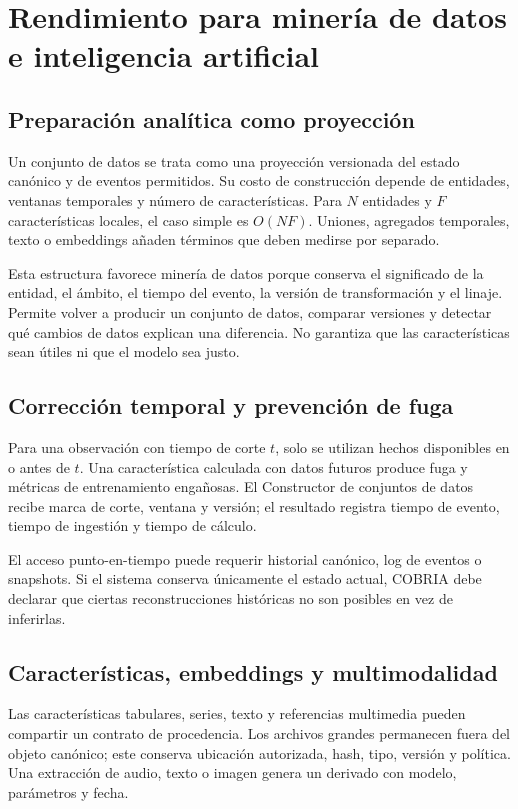 \chapter{Rendimiento para minería de datos e inteligencia artificial}

\section{Preparación analítica como proyección}

Un conjunto de datos se trata como una proyección versionada del estado canónico y de eventos
permitidos. Su costo de construcción depende de entidades, ventanas temporales y número
de características. Para $N$ entidades y $F$ características locales, el caso simple es
$O(NF)$. Uniones, agregados temporales, texto o embeddings añaden términos que deben
medirse por separado.

Esta estructura favorece minería de datos porque conserva el significado de la entidad,
el ámbito, el tiempo del evento, la versión de transformación y el linaje. Permite volver
a producir un conjunto de datos, comparar versiones y detectar qué cambios de datos explican una
diferencia. No garantiza que las características sean útiles ni que el modelo sea justo.

\section{Corrección temporal y prevención de fuga}

Para una observación con tiempo de corte $t$, solo se utilizan hechos disponibles en o
antes de $t$. Una característica calculada con datos futuros produce fuga y métricas de
entrenamiento engañosas. El Constructor de conjuntos de datos recibe marca de corte, ventana y versión; el
resultado registra tiempo de evento, tiempo de ingestión y tiempo de cálculo.

El acceso punto-en-tiempo puede requerir historial canónico, log de eventos o snapshots.
Si el sistema conserva únicamente el estado actual, COBRIA debe declarar que ciertas
reconstrucciones históricas no son posibles en vez de inferirlas.

\section{Características, embeddings y multimodalidad}

Las características tabulares, series, texto y referencias multimedia pueden compartir
un contrato de procedencia. Los archivos grandes permanecen fuera del objeto canónico;
este conserva ubicación autorizada, hash, tipo, versión y política. Una extracción de
audio, texto o imagen genera un derivado con modelo, parámetros y fecha.

